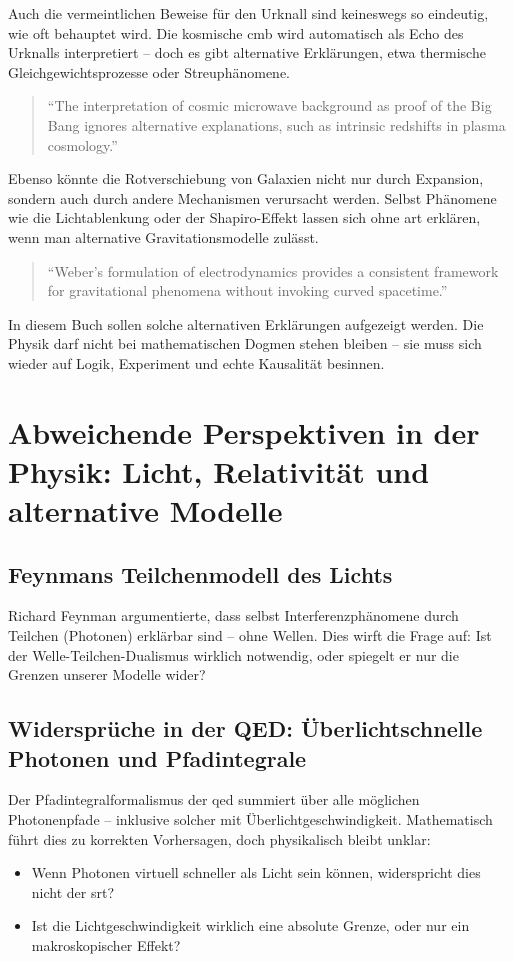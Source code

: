 Auch die vermeintlichen Beweise für den Urknall sind keineswegs so eindeutig, wie oft behauptet wird. Die kosmische \gls{cmb} wird automatisch als Echo des Urknalls
interpretiert – doch es gibt alternative Erklärungen, etwa thermische Gleichgewichtsprozesse oder Streuphänomene.
\begin{quote}
    \enquote{The interpretation of cosmic microwave background as proof of the Big Bang ignores alternative explanations, such as intrinsic redshifts in plasma cosmology.} \cite{Arp1998}
\end{quote}
Ebenso könnte die Rotverschiebung von Galaxien nicht nur durch Expansion, sondern auch durch andere Mechanismen verursacht werden. Selbst Phänomene wie die Lichtablenkung oder der
Shapiro-Effekt lassen sich ohne \gls{art} erklären, wenn man alternative Gravitationsmodelle zulässt.
\begin{quote}
    \enquote{Weber's formulation of electrodynamics provides a consistent framework for gravitational phenomena without invoking curved spacetime.} \cite{WeberElectrodynamics}
\end{quote}
In diesem Buch sollen solche alternativen Erklärungen aufgezeigt werden. Die Physik darf nicht bei mathematischen Dogmen stehen bleiben – sie muss sich wieder auf Logik, Experiment und
echte Kausalität besinnen.

\section{Abweichende Perspektiven in der Physik: Licht, Relativität und alternative Modelle}
\subsection{Feynmans Teilchenmodell des Lichts}
Richard Feynman argumentierte, dass selbst Interferenzphänomene durch Teilchen (Photonen) erklärbar sind – ohne Wellen. Dies wirft die Frage auf: Ist der Welle-Teilchen-Dualismus wirklich
notwendig, oder spiegelt er nur die Grenzen unserer Modelle wider?

\subsection{Widersprüche in der QED: Überlichtschnelle Photonen und Pfadintegrale}
Der Pfadintegralformalismus der \gls{qed} summiert über alle möglichen Photonenpfade – inklusive solcher mit Überlichtgeschwindigkeit. Mathematisch führt dies zu korrekten Vorhersagen,
doch physikalisch bleibt unklar:
\begin{itemize}
    \item Wenn Photonen virtuell schneller als Licht sein können, widerspricht dies nicht der \gls{srt}?
    \item Ist die Lichtgeschwindigkeit wirklich eine absolute Grenze, oder nur ein makroskopischer Effekt?
\end{itemize}

